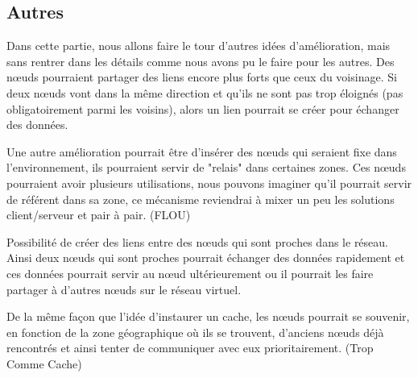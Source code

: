 
\subsection{Autres}
Dans cette partie, nous allons faire le tour d'autres idées d'amélioration, mais sans rentrer dans les détails comme nous avons pu le faire pour les autres. Des nœuds pourraient partager des liens encore plus forts que ceux du voisinage. Si deux nœuds vont dans la même direction et qu'ils ne sont pas trop éloignés (pas obligatoirement parmi les voisins), alors un lien pourrait se créer pour échanger des données.

\par Une autre amélioration pourrait être d'insérer des nœuds qui seraient fixe dans l'environnement, ils pourraient servir de "relais" dans certaines zones. Ces nœuds pourraient avoir plusieurs utilisations, nous pouvons imaginer qu'il pourrait servir de référent dans sa zone, ce mécanisme reviendrai à mixer un peu les solutions client/serveur et pair à pair. (FLOU)

\par Possibilité de créer des liens entre des nœuds qui sont proches dans le réseau. Ainsi deux nœuds qui sont proches pourrait échanger des données rapidement et ces données pourrait servir au nœud ultérieurement ou il pourrait les faire partager à d'autres nœuds sur le réseau virtuel. 
 
\par De la même façon que l'idée d'instaurer un cache, les nœuds pourrait se souvenir, en fonction de la zone géographique où ils se trouvent, d'anciens nœuds déjà rencontrés et ainsi tenter de communiquer avec eux prioritairement. (Trop Comme Cache)



